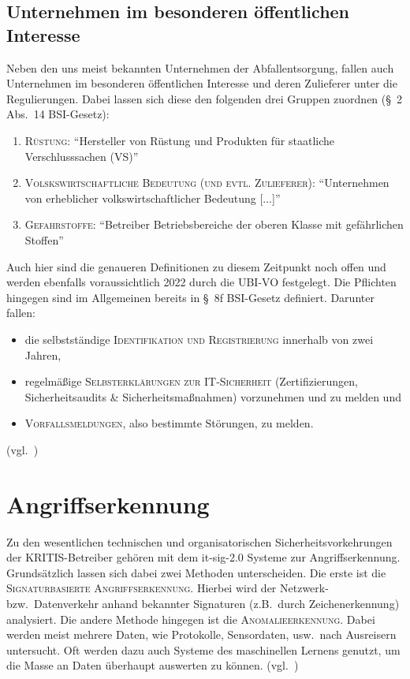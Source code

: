 \subsection{Unternehmen im besonderen öffentlichen Interesse}\label{ssec:unternehmen-im-besonderen-offentlichen-interesse}
Neben den uns meist bekannten Unternehmen der Abfallentsorgung,
fallen auch Unternehmen im besonderen öffentlichen Interesse und deren Zulieferer unter die Regulierungen.
Dabei lassen sich diese den folgenden drei Gruppen zuordnen (§~2 Abs.~14 BSI-Gesetz):
\begin{enumerate}
    \item \textsc{Rüstung}:
    \enquote{Hersteller von Rüstung und Produkten für staatliche Verschlusssachen (VS)}~\cite{neue-it-sig-2.0}
    \item \textsc{Volskswirtschaftliche Bedeutung (und evtl. Zulieferer)}:
    \enquote{Unternehmen von erheblicher volkswirtschaftlicher Bedeutung [...]}~\cite{neue-it-sig-2.0}
    \item \textsc{Gefahrstoffe}:
    \enquote{Betreiber Betriebsbereiche der oberen Klasse mit gefährlichen Stoffen}~\cite{neue-it-sig-2.0}
\end{enumerate}
Auch hier sind die genaueren Definitionen zu diesem Zeitpunkt noch offen und werden ebenfalls voraussichtlich 2022 durch die UBI-VO festgelegt.
Die Pflichten hingegen sind im Allgemeinen bereits in §~8f BSI-Gesetz definiert.
Darunter fallen:
\begin{itemize}
    \item die selbstständige \textsc{Identifikation und Registrierung} innerhalb von zwei Jahren,
    \item regelmäßige \textsc{Selbsterklärungen zur IT-Sicherheit} (Zertifizierungen, Sicherheitsaudits \& Sicherheitsmaßnahmen) vorzunehmen und zu melden und
    \item \textsc{Vorfallsmeldungen}, also bestimmte Störungen, zu melden.
\end{itemize}
(vgl.~\cite{neue-it-sig-2.0})

\section{Angriffserkennung}\label{sec:angriffserkennung}
Zu den wesentlichen technischen und organisatorischen Sicherheitsvorkehrungen der KRITIS-Betreiber gehören mit dem \acrshort{it-sig-2.0} Systeme zur Angriffserkennung.
Grundsätzlich lassen sich dabei zwei Methoden unterscheiden.
Die erste ist die \textsc{Signaturbasierte Angriffserkennung}.
Hierbei wird der Netzwerk- bzw.\ Datenverkehr anhand bekannter Signaturen (z.B.\ durch Zeichenerkennung) analysiert.
Die andere Methode hingegen ist die \textsc{Anomalieerkennung}.
Dabei werden meist mehrere Daten, wie Protokolle, Sensordaten, usw.\ nach Ausreisern untersucht.
Oft werden dazu auch Systeme des maschinellen Lernens genutzt, um die Masse an Daten überhaupt auswerten zu können.
(vgl.~\cite{neue-it-sig-2.0,intrusion-prevention-system})

